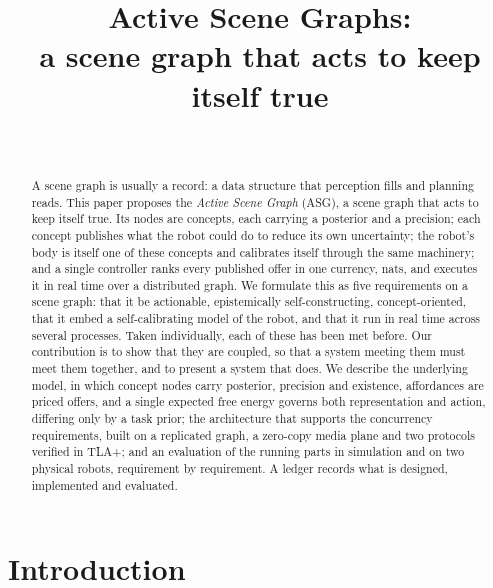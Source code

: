 \documentclass[10pt,twocolumn]{IEEEtran}
\newcommand{\asg}{ASG}
\newcommand{\nats}{nats}
\begin{document}
\title{Active Scene Graphs:\\a scene graph that acts to keep itself true}

\author{\\
}

\maketitle

\begin{abstract}
A scene graph is usually a record: a data structure that perception fills and planning reads. This
paper proposes the \emph{Active Scene Graph} (\asg), a scene graph that acts to keep itself true.
Its nodes are concepts, each carrying a posterior and a precision; each concept publishes what the
robot could do to reduce its own uncertainty; the robot's body is itself one of these concepts and
calibrates itself through the same machinery; and a single controller ranks every published offer in
one currency, \nats, and executes it in real time over a distributed graph. We formulate this as
five requirements on a scene graph: that it be actionable, epistemically self-constructing,
concept-oriented, that it embed a self-calibrating model of the robot, and that it run in real time
across several processes. Taken individually, each of these has been met before. Our contribution is
to show that they are coupled, so that a system meeting them must meet them together, and to present
a system that does. We describe the underlying model, in which concept nodes carry posterior,
precision and existence, affordances are priced offers, and a single expected free energy governs both
representation and action, differing only by a task prior; the architecture that supports the
concurrency requirements, built on a replicated graph, a zero-copy media plane and two protocols
verified in TLA+; and an evaluation of the running parts in simulation and on two physical robots,
requirement by requirement. A ledger records what is designed, implemented and evaluated.
\end{abstract}

\section{Introduction}\label{sec:intro}
\end{document}
